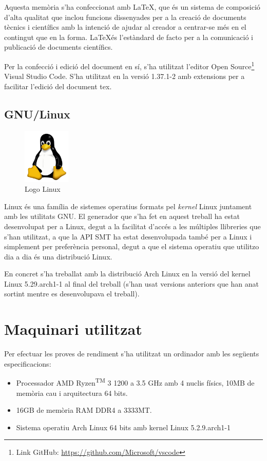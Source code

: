 \documentclass[11pt,a4paper,twoside]{report}
\begin{document}
  Aquesta memòria s'ha confeccionat amb \LaTeX, que és un sistema de composició d'alta qualitat que inclou funcions dissenyades per a la creació de documents tècnics i científics amb la intenció de ajudar al creador a centrar-se més en el contingut que en la forma.
\LaTeX és l'estàndard de facto per a la comunicació i publicació de documents científics. 

Per la confecció i edició del document en sí, s'ha utilitzat l'editor Open Source\footnote{Link GitHub: \url{https://github.com/Microsoft/vscode}} Visual Studio Code. S'ha utilitzat en la versió 1.37.1-2 amb extensions per a facilitar l'edició del document tex.



  \subsection{GNU/Linux}
  \begin{figure}[ht!]
    \centering
    \includegraphics[width=0.2\textwidth]{Diagrames/Linux.png}
    \caption{Logo Linux}
    \label{fig:linux}
  \end{figure}
  Linux és una família de sistemes operatius formats pel \textit{kernel} Linux juntament amb les utilitats GNU. 
  El generador que s'ha fet en aquest treball ha estat desenvolupat per a Linux, degut a la facilitat d'accés a les múltiples llibreries que s'han utilitzat, a que la API SMT ha estat desenvolupada també per a Linux i simplement per preferència personal, degut a que el sistema operatiu que utilitzo dia a dia és una distribució Linux.

  En concret s'ha treballat amb la distribució Arch Linux en la versió del kernel Linux 5.29.arch1-1 al final del treball (s'han usat versions anteriors que han anat sortint mentre es desenvolupava el treball).


  \section{Maquinari utilitzat}
  Per efectuar les proves de rendiment s'ha utilitzat un ordinador amb les següents especificacions:
  \begin{itemize}
    \item Processador AMD Ryzen\textsuperscript{TM} 3 1200 a 3.5 GHz amb 4 nuclis físics,  10MB de memòria cau i arquitectura 64 bits.
    \item 16GB de memòria RAM DDR4 a 3333MT.
    \item Sistema operatiu Arch Linux 64 bits amb kernel Linux 5.2.9.arch1-1
  \end{itemize} 
  
\end{document}
